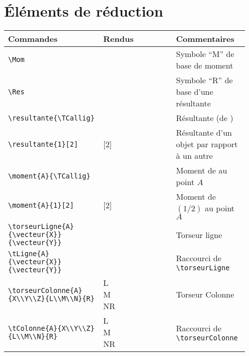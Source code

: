 \documentclass[a4paper,10pt]{article}
\begin{document}
	\section{Éléments de réduction}
	\noindent
	\begin{tabular}{|p{0.35\linewidth}|p{0.3\linewidth}|p{0.3\linewidth}|}
		\hline
			\textbf{Commandes}&\textbf{Rendus}&\textbf{Commentaires}
		\\\hline\hline
			\verb!\Mom!			&	\Mom			&	Symbole ``M'' de base de moment
		\\\hline
			\verb!\Res!			&	\Res			&	Symbole ``R'' de base d'une résultante
		\\\hline
			\verb!\resultante{\TCallig}!		&	\resultante{\TCallig}		&	Résultante (de \tT)
		\\\hline
			\verb!\resultante{1}[2]!	&	\resultante{1}[2]		&	Résultante d'un objet par rapport à un autre
		\\\hline
			\verb!\moment{A}{\TCallig}!		&	\moment{A}{\TCallig}		&	Moment de \tT au point $A$
		\\\hline
			\verb!\moment{A}{1}[2]!		&	\moment{A}{1}[2]		&	Moment de $(1/2)$ au point $A$
		\\\hline
			\verb!\torseurLigne{A}!\qquad\verb!{\vecteur{X}}!\qquad\verb!{\vecteur{Y}}!		&	\torseurLigne{A}{\vecteur{X}}{\vecteur{Y}}	&	Torseur ligne
		\\\hline
			\verb!\tLigne{A}!\qquad\verb!{\vecteur{X}}!\qquad\verb!{\vecteur{Y}}!		&	\torseurLigne{A}{\vecteur{X}}{\vecteur{Y}}	&	Raccourci de \verb!\torseurLigne!
		\\\hline
			\verb!\torseurColonne{A}!\qquad\verb!{X\\Y\\Z}!\qquad\verb!{L\\M\\N}{R}!		&	\torseurColonne{A}{X\\Y\\Z}{L\\M\\N}{R}	&	Torseur Colonne
		\\\hline
			\verb!\tColonne{A}!\qquad\verb!{X\\Y\\Z}!\qquad\verb!{L\\M\\N}{R}!		&	\tColonne{A}{X\\Y\\Z}{L\\M\\N}{R}	&	Raccourci de \verb!\torseurColonne!
		\\\hline
	\end{tabular}
\end{document}
